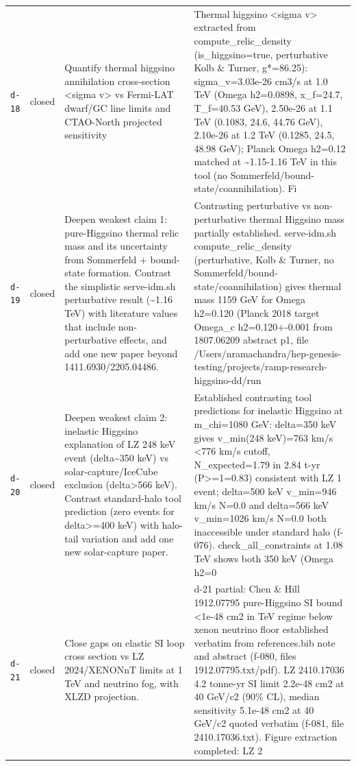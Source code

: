 \documentclass[11pt,a4paper]{article}
\begin{document}
\begin{longtable}{@{}p{}p{}p{}p{}@{}}
\texttt{d-18} & closed & Quantify thermal higgsino annihilation cross-section \textless{}sigma v\textgreater{} vs Fermi-LAT dwarf/GC line limits and CTAO-North projected sensitivity & Thermal higgsino \textless{}sigma v\textgreater{} extracted from compute\_relic\_density (is\_higgsino=true, perturbative Kolb \& Turner, g*=86.25): sigma\_v=3.03e-26 cm3/s at 1.0 TeV (Omega h2=0.0898, x\_f=24.7, T\_f=40.53 GeV), 2.50e-26 at 1.1 TeV (0.1083, 24.6, 44.76 GeV), 2.10e-26 at 1.2 TeV (0.1285, 24.5, 48.98 GeV); Planck Omega h2=0.12 matched at \textasciitilde{}1.15-1.16 TeV in this tool (no Sommerfeld/bound-state/coannihilation). Fi \\
\texttt{d-19} & closed & Deepen weakest claim 1: pure-Higgsino thermal relic mass and its uncertainty from Sommerfeld + bound-state formation. Contrast the simplistic serve-idm.sh perturbative result (\textasciitilde{}1.16 TeV) with literature values that include non-perturbative effects, and add one new paper beyond 1411.6930/2205.04486. & Contrasting perturbative vs non-perturbative thermal Higgsino mass partially established. serve-idm.sh compute\_relic\_density (perturbative, Kolb \& Turner, no Sommerfeld/bound-state/coannihilation) gives thermal mass 1159 GeV for Omega h2=0.120 (Planck 2018 target Omega\_c h2=0.120+-0.001 from 1807.06209 abstract p1, file /Users/nramachandra/hep-genesis-testing/projects/ramp-research-higgsino-dd/run \\
\texttt{d-20} & closed & Deepen weakest claim 2: inelastic Higgsino explanation of LZ 248 keV event (delta\textasciitilde{}350 keV) vs solar-capture/IceCube exclusion (delta\textgreater{}566 keV). Contrast standard-halo tool prediction (zero events for delta\textgreater{}=400 keV) with halo-tail variation and add one new solar-capture paper. & Established contrasting tool predictions for inelastic Higgsino at m\_chi=1080 GeV: delta=350 keV gives v\_min(248 keV)=763 km/s \textless{}776 km/s cutoff, N\_expected=1.79 in 2.84 t-yr (P\textgreater{}=1=0.83) consistent with LZ 1 event; delta=500 keV v\_min=946 km/s N=0.0 and delta=566 keV v\_min=1026 km/s N=0.0 both inaccessible under standard halo (f-076). check\_all\_constraints at 1.08 TeV shows both 350 keV (Omega h2=0 \\
\texttt{d-21} & closed & Close gaps on elastic SI loop cross section vs LZ 2024/XENONnT limits at 1 TeV and neutrino fog, with XLZD projection. & d-21 partial: Chen \& Hill 1912.07795 pure-Higgsino SI bound \textless{}1e-48 cm2 in TeV regime below xenon neutrino floor established verbatim from references.bib note and abstract (f-080, files 1912.07795.txt/pdf). LZ 2410.17036 4.2 tonne-yr SI limit 2.2e-48 cm2 at 40 GeV/c2 (90\% CL), median sensitivity 5.1e-48 cm2 at 40 GeV/c2 quoted verbatim (f-081, file 2410.17036.txt). Figure extraction completed: LZ 2 \\

\end{longtable}
\end{document}
